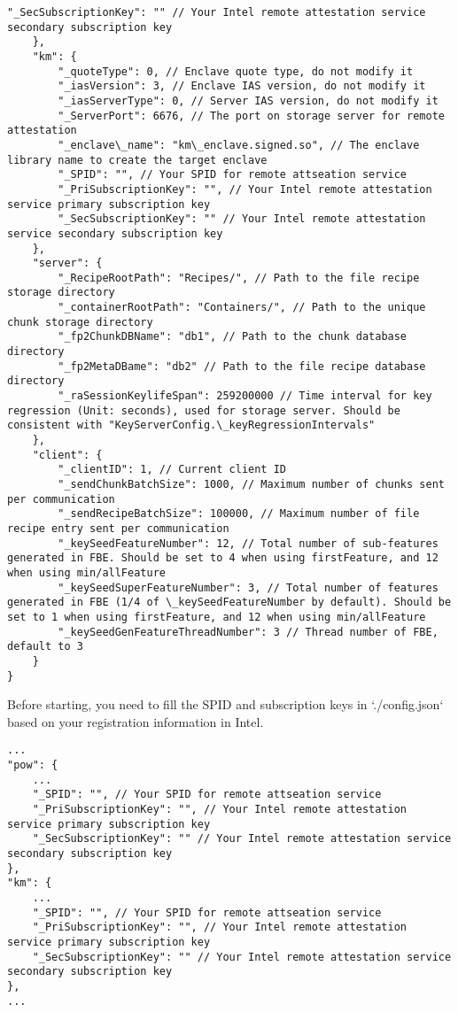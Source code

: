 \begin{lstlisting}[style=json]
        "_SecSubscriptionKey": "" // Your Intel remote attestation service secondary subscription key
    },
    "km": {
        "_quoteType": 0, // Enclave quote type, do not modify it
        "_iasVersion": 3, // Enclave IAS version, do not modify it
        "_iasServerType": 0, // Server IAS version, do not modify it
        "_ServerPort": 6676, // The port on storage server for remote attestation
        "_enclave\_name": "km\_enclave.signed.so", // The enclave library name to create the target enclave
        "_SPID": "", // Your SPID for remote attseation service
        "_PriSubscriptionKey": "", // Your Intel remote attestation service primary subscription key
        "_SecSubscriptionKey": "" // Your Intel remote attestation service secondary subscription key
    },
    "server": {
        "_RecipeRootPath": "Recipes/", // Path to the file recipe storage directory
        "_containerRootPath": "Containers/", // Path to the unique chunk storage directory
        "_fp2ChunkDBName": "db1", // Path to the chunk database directory
        "_fp2MetaDBame": "db2" // Path to the file recipe database directory
        "_raSessionKeylifeSpan": 259200000 // Time interval for key regression (Unit: seconds), used for storage server. Should be consistent with "KeyServerConfig.\_keyRegressionIntervals"
    },
    "client": {
        "_clientID": 1, // Current client ID
        "_sendChunkBatchSize": 1000, // Maximum number of chunks sent per communication
        "_sendRecipeBatchSize": 100000, // Maximum number of file recipe entry sent per communication
        "_keySeedFeatureNumber": 12, // Total number of sub-features generated in FBE. Should be set to 4 when using firstFeature, and 12 when using min/allFeature
        "_keySeedSuperFeatureNumber": 3, // Total number of features generated in FBE (1/4 of \_keySeedFeatureNumber by default). Should be set to 1 when using firstFeature, and 12 when using min/allFeature
        "_keySeedGenFeatureThreadNumber": 3 // Thread number of FBE, default to 3
    }
}
\end{lstlisting}

Before starting, you need to fill the SPID and subscription keys in `./config.json` based on your registration information in Intel.

\begin{lstlisting}[style=json]
...
"pow": {
    ...
    "_SPID": "", // Your SPID for remote attseation service
    "_PriSubscriptionKey": "", // Your Intel remote attestation service primary subscription key
    "_SecSubscriptionKey": "" // Your Intel remote attestation service secondary subscription key
},
"km": {
    ...
    "_SPID": "", // Your SPID for remote attseation service
    "_PriSubscriptionKey": "", // Your Intel remote attestation service primary subscription key
    "_SecSubscriptionKey": "" // Your Intel remote attestation service secondary subscription key
},
...
\end{lstlisting}

